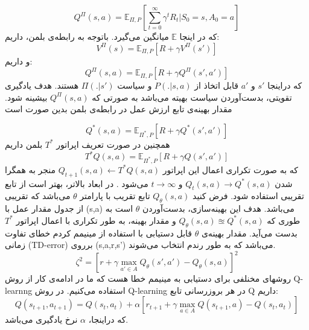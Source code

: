  \begin{equation}
	Q^{\Pi}(s,a) = \mathbb{E}_{\Pi,P}[\sum_{t=0}^{\infty}\gamma^tR_t|S_0=s,A_0=a]
\end{equation}
  که در اینجا 
  $\mathbb{E}$
  میانگین می‌گیرد.
  باتوجه به رابطه‌ی بلمن، داریم:
 \begin{equation}
	V^{\Pi}(s) = \mathbb{E}_{\Pi,P}[R+\gamma V^{\Pi}(s')]
\end{equation}  
  و داریم:
   \begin{equation}
  	Q^{\Pi}(s,a) = \mathbb{E}_{\Pi,P}[R+\gamma Q^{\Pi}(s',a')]
  \end{equation}  
که دراینجا $s'$
و $a'$
قابل اتخاذ از 
$P(.|s,a)$
و سیاست
$\Pi(.|s')$
هستند.
هدف یادگیری تقویتی، بدست‌آوردن سیاست بهیته می‌باشد به صورتی که 
$Q^{\Pi}(s,a)$
بیشینه شود.
مقدار بهینه‌ی تابع ارزش عمل در رابطه‌ی بلمن بدین صورت است

\begin{equation}
	Q^{*}(s,a) = \mathbb{E}_{\Pi^*,P}[R+\gamma Q^{*}(s',a')]
\end{equation} 
همچنین در صورت تعریف اپراتور $T^*$ بلمن داریم
\begin{equation}
	T^{*}Q(s,a) = \mathbb{E}_{\Pi^*,P}[R+\gamma Q(s',a')]
\end{equation} 
که به صورت تکراری اعمال این اپراتور 
$Q_{t+1}(s,a) \leftarrow T^{*}Q(s,a) $
منجر به همگرا شدن 
$Q_{t}(s,a) \rightarrow Q^*(s,a)$
 و
 $t \rightarrow \infty $
می‌شود
\cite{montague1999reinforcement,gan1}.
در ابعاد بالاتر، بهتر است از تابع تقریبی استفاده
شود. فرض کنید 
$Q_{\theta}(s,a)$
تابع تقریب با پارامتر $\theta$
می‌باشد که تقریبی از جدول مقدار عمل با (s,a)
می‌باشد. هدف این بهینه‌سازی، بدست‌آوردن $\theta$
است به طوری که 
$Q_{\theta}(s,a) \approxeq Q^{*}(s,a)$
و مقدار بهینه، به طور تکراری با اعمال اپراتور $T^*$
بدست می‌آید. 
مقدار بهینه‌ی 
$\theta$
قابل دستیابی با استفاده از مینیمم کردم خطای تفاوت زمانی (TD-error)
برروی (s,a,r,s') می‌باشد که به طور رندم انتخاب می‌شوند.
\begin{equation}
\zeta^2 = [r + \gamma \max_{a' \in A}{Q_{\theta}(s',a')}-Q_{\theta}(s,a)]^2
\end{equation}
روشهای مخنلفی برای دستیابی به مینیمم خطا هست که ما در ادامه‌ی کار از روش Q-learnng استفاده می‌کنیم.
در روش Q-learning در هر بروزرسانی تابع Q داریم:
\begin{equation}
	Q(s_{t+1},a_{t+1}) = Q(s_t,a_t)+\alpha[ r_{t+1} + \gamma \max_{a \in A}{Q(s_{t+1},a)}-Q(s_t,a_t)]
\end{equation}
که دراینجا، $\alpha$
نرخ یادگیری می‌باشد.
